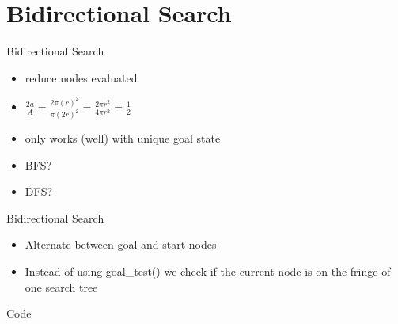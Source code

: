 \documentclass[presentation]{beamer}
\begin{document}
\section{Bidirectional Search}
\begin{frame}{Bidirectional Search}
  \begin{itemize}
  \item reduce nodes evaluated
  \item $\frac{2a}{A} =
    \frac{2\pi(r)^2}{\pi(2r)^2} =
    \frac{2\pi r^2}{4\pi r^2} = \frac{1}{2}$
  \item only works (well) with
    unique goal state
  \end{itemize}
  \begin{center}
  \begin{itemize}
  \item<1> BFS?
  \item<1> DFS? 
  \end{itemize}
\end{center}
\end{frame}

\begin{frame}{Bidirectional Search}
  \begin{itemize}
   
  \item Alternate between goal and
    start nodes
  \item Instead of using
    goal\_test() we check if the
    current node is on the fringe of one
    search tree
  \end{itemize}
  Code
\end{frame}
\end{document}
